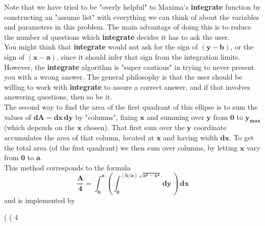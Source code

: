 \documentclass[12pt]{article}
\begin{document}
\noindent Note that we have tried to be "overly helpful" to Maxima's \textbf{integrate}
  function by constructing an "assume list" with everything we can think of
  about the variables and parameters in this problem.
The main advantage of doing this is to reduce the number of questions
  which \textbf{integrate} decides it has to ask the user.\\ 

\noindent You might think that \textbf{integrate} would not ask for the sign of $\mathbf{(y - b)}$,
  or the sign of $\mathbf{(x - a)}$, since it should infer that sign from the integration limits.
However, the \textbf{integrate} algorithm is "super cautious" in trying to never
  present you with a wrong answer.
The general philosophy is that the user should be willing to work with \textbf{integrate}
  to assure a correct answer, and if that involves answering questions, then so be it.\\

\noindent The second way to find the area of the first quadrant of this ellipse is to sum the values
  of $\mathbf{dA = dx\,dy}$ by "columns", fixing $\mathbf{x}$ and summing over
  $\mathbf{y}$ from $\mathbf{0}$ to $\mathbf{y_{max}}$
  (which depends on the $\mathbf{x}$ chosen). 
That first sum over the $\mathbf{y}$ coordinate accumulates the area of that column, located at $\mathbf{x}$
  and having width $\mathbf{dx}$.
To get the total area (of the first quadrant) we then sum over columns, by letting
  $\mathbf{x}$ vary from $\mathbf{0}$ to $\mathbf{a}$.  \\

\noindent This method corresponds to the formula
\begin{equation}
\mathbf{\frac{A}{4} = \int_{0}^{a}  \left( \int_{0}^{ (b/a)\,\sqrt{a^2 - x^2} } dy \, \right) \, dx }
\end{equation}
and is implemented by
\begin{myVerbatim}
(%
(%
                                       4
\end{myVerbatim}
\end{document}

